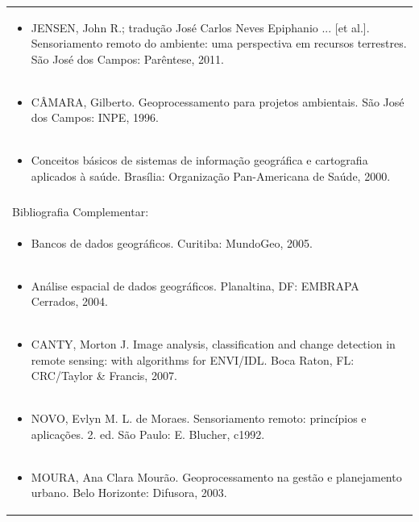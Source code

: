 \documentclass[11pt]{article}
\begin{document}
\begin{center}
\begin{longtable}{|p{4cm}|p{4cm}|p{4cm}|p{4cm}|}
\multicolumn{4}{|p{\dimexpr 16cm + 6\tabcolsep\relax}|}{\begin{itemize}\item JENSEN, John R.; tradução José Carlos Neves Epiphanio ... [et al.]. Sensoriamento remoto do ambiente: uma perspectiva em recursos terrestres. São José dos Campos: Parêntese, 2011.\end{itemize}}\\
\multicolumn{4}{|p{\dimexpr 16cm + 6\tabcolsep\relax}|}{\begin{itemize}\item CÂMARA, Gilberto. Geoprocessamento para projetos ambientais. São José dos Campos: INPE, 1996.\end{itemize}}\\
\multicolumn{4}{|p{\dimexpr 16cm + 6\tabcolsep\relax}|}{\begin{itemize}\item Conceitos básicos de sistemas de informação geográfica e cartografia aplicados à saúde. Brasília: Organização Pan-Americana de Saúde, 2000.\end{itemize}}\\
\multicolumn{4}{|p{16cm}|}{}\\
\hline
\multicolumn{4}{|p{16cm}|}{Bibliografia Complementar:}\\*
\multicolumn{4}{|p{\dimexpr 16cm + 6\tabcolsep\relax}|}{\begin{itemize}\item Bancos de dados geográficos. Curitiba: MundoGeo, 2005.\end{itemize}}\\
\multicolumn{4}{|p{\dimexpr 16cm + 6\tabcolsep\relax}|}{\begin{itemize}\item Análise espacial de dados geográficos. Planaltina, DF: EMBRAPA Cerrados, 2004.\end{itemize}}\\
\multicolumn{4}{|p{\dimexpr 16cm + 6\tabcolsep\relax}|}{\begin{itemize}\item CANTY, Morton J. Image analysis, classification and change detection in remote sensing: with algorithms for ENVI/IDL. Boca Raton, FL: CRC/Taylor \& Francis, 2007.\end{itemize}}\\
\multicolumn{4}{|p{\dimexpr 16cm + 6\tabcolsep\relax}|}{\begin{itemize}\item NOVO, Evlyn M. L. de Moraes. Sensoriamento remoto: princípios e aplicações. 2. ed. São Paulo: E. Blucher, c1992.\end{itemize}}\\
\multicolumn{4}{|p{\dimexpr 16cm + 6\tabcolsep\relax}|}{\begin{itemize}\item MOURA, Ana Clara Mourão. Geoprocessamento na gestão e planejamento urbano. Belo Horizonte: Difusora, 2003.\end{itemize}}\\
\hline
\end{longtable}
\end{center}
\end{document}
